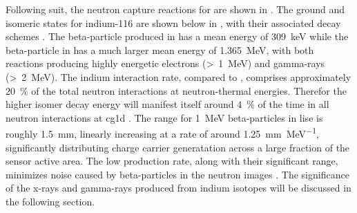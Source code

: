 \documentclass[../../../main.tex]{subfiles}%
\begin{document}
    Following suit, the neutron capture reactions for  are shown in .
    The ground and isomeric states for indium-116 are shown below in , with their associated decay schemes \cite{Blachot_2010}.
    The \gls{beta-particle} produced in  has a mean energy of \SI{309}{\kilo\electronvolt} while the \gls{beta-particle} in  has a much larger mean energy of \SI{1.365}{\mega\electronvolt}, with both reactions producing highly energetic electrons (\SI{1}[>]{\mega\electronvolt}) and \glspl{gamma-ray} (\SI{2}[>]{\mega\electronvolt}).
    The indium interaction rate, compared to , comprises approximately \SI{20}{\percent} of the total neutron interactions at \gls{neutron-thermal} energies.
    Therefor the higher isomer decay energy will manifest itself around \SI{4}{\percent} of the time in all neutron interactions at \gls{cg1d} \cite{Lukosi_2016a}.
    The range for \SI{1}{\mega\electronvolt} \glspl{beta-particle} in \gls{lise} is roughly \SI{1.5}{\milli\meter}, linearly increasing at a rate of around \SI[per-mode=symbol]{1.25}{\milli\meter\per\mega\electronvolt}, significantly distributing charge carrier generatation across a large fraction of the sensor active area.
    The low production rate, along with their significant range, minimizes noise caused by \glspl{beta-particle} in the neutron images \cite{Lukosi_2016}.
    The significance of the \glspl{x-ray} and \glspl{gamma-ray} produced from indium isotopes will be discussed in the following section.
\end{document}
